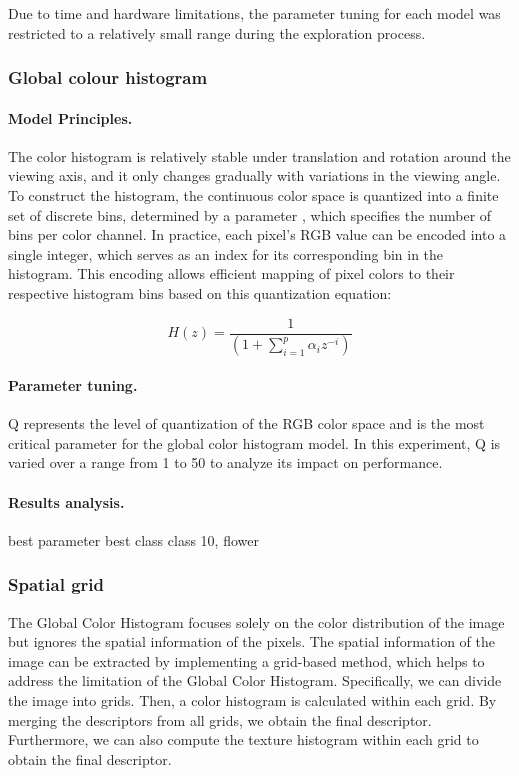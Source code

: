\documentclass{article}
\begin{document}
Due to time and hardware limitations, the parameter tuning for each model was restricted to a relatively small range during the exploration process.

\subsubsection{Global colour histogram}

\paragraph{Model Principles.}

The color histogram is relatively stable under translation and rotation around the viewing axis, and it only changes gradually with variations in the viewing angle\citep{ComputerVision}. To construct the histogram, the continuous color space is quantized into a finite set of discrete bins, determined by a parameter , which specifies the number of bins per color channel. In practice, each pixel’s RGB value can be encoded into a single integer, which serves as an index for its corresponding bin in the histogram. This encoding allows efficient mapping of pixel colors to their respective histogram bins based on this quantization equation: 

\begin{equation}
\label{eqn:LPC}
H(z) = \frac{1}{(1 + \sum_{i=1}^p \alpha_i z^{-i})}
\end{equation}

\paragraph{Parameter tuning.}

Q represents the level of quantization of the RGB color space and is the most critical parameter for the global color histogram model. In this experiment,  Q is varied over a range from 1 to 50 to analyze its impact on performance.

\paragraph{Results analysis.}
best parameter
best class   class 10, flower

\subsubsection{Spatial grid}

The Global Color Histogram focuses solely on the color distribution of the image but ignores the spatial information of the pixels. The spatial information of the image can be extracted by implementing a grid-based method, which helps to address the limitation of the Global Color Histogram. Specifically, we can divide the image into grids. Then, a color histogram is calculated within each grid. By merging the descriptors from all grids, we obtain the final descriptor. Furthermore, we can also compute the texture histogram within each grid to obtain the final descriptor.
\end{document}

